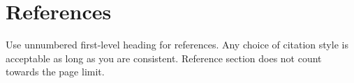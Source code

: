 \documentclass{article}
\begin{document}
            


    \section*{References}
        Use unnumbered first-level heading for references.
        Any choice of citation style is acceptable as long as you are consistent.
        Reference section does not count towards the page limit.
    \medskip





\end{document}
